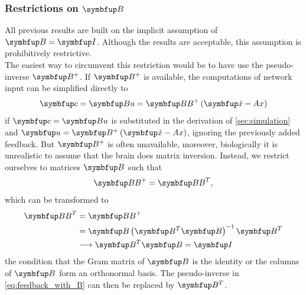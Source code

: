 \subsubsection{Restrictions on $\bmu{B}$}
All previous results are built on the implicit assumption of $\bmu{B} = \bmu{I}$. Although the results are acceptable, this assumption is prohibitively restrictive.\\
The easiest way to circumvent this restriction would be to have use the pseudo-inverse  $\bmu{B}^+$. If $\bmu{B}^+$ is available, the computations of network input can be simplified directly to
\begin{equation}\label{eq:feedback_with_B}
	\bmu{c} = \bmu{Bu}= \bmu{BB}^+\left(\bmu{\dot{x}- Ax}\right)
\end{equation}
if $\bmu{c} = \bmu{Bu}$ is substituted in the derivation of \cref{sec:simulation} and $\bmu{u} = \bmu{B}^+\left(\bmu{\dot{x} - Ax}\right)$,
ignoring the previously added feedback. But $\bmu{B}^+$ is often unavailable, moreover, biologically it is unrealistic to assume that the brain does matrix inversion. Instead, we restrict ourselves to matrices $\bmu{B}$ such that
\begin{equation}
	\bmu{BB}^+ = \bmu{BB}^T,
\end{equation}
which can be transformed to
\begin{equation}
\begin{aligned}
	\bmu{BB}^T &= \bmu{BB}^+\\
			  &= \bmu{B}\left(\bmu{B}^T\bmu{B}\right)^{-1}\bmu{B}^T\\
			  &\longrightarrow \bmu{B}^T\bmu{B} = \bmu{I}
\end{aligned}
\end{equation}
the condition that the Gram matrix of $\bmu{B}$ is the identity or the columns of $\bmu{B}$ form an orthonormal basis. The pseudo-inverse in \cref{eq:feedback_with_B} can then be replaced by $\bmu{B}^T$.\\

